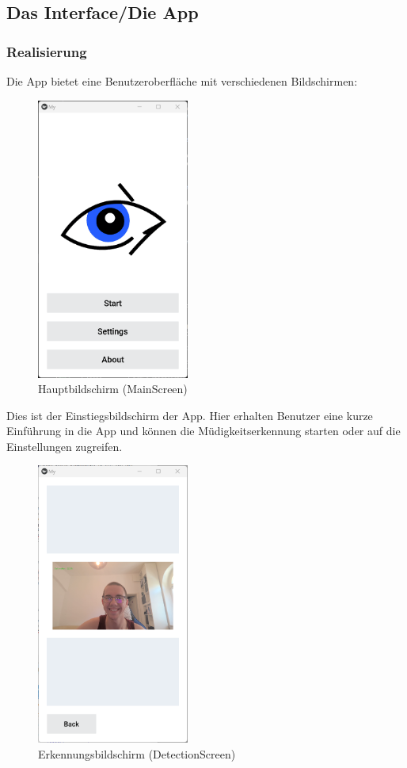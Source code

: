 \subsection{Das Interface/Die App}
\label{ssec:interface}

	\subsubsection{Realisierung}
	\label{sssec:realisierung}
		
		Die App bietet eine Benutzeroberfläche mit verschiedenen Bildschirmen:
		\begin{figure}[h]
			\centering
			\includegraphics[width=5cm]{images/mainscreen.png} %
			\caption{Hauptbildschirm (MainScreen)}
			\label{fig:mainscreen}
		\end{figure}
		Dies ist der Einstiegsbildschirm der App. Hier erhalten Benutzer eine kurze Einführung in die App und können die Müdigkeitserkennung starten oder auf die Einstellungen zugreifen.
		\begin{figure}[h]
			\centering
			\includegraphics[width=5cm]{images/detectionscreen.png} %
			\caption{Erkennungsbildschirm (DetectionScreen)}
			\label{fig:detectionscreen}
		\end{figure}
